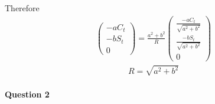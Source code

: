 \documentclass[11pt,a4paper]{article}
\begin{document}
\begin{enumerate}
Therefore
\begin{align}
\begin{pmatrix}
-a C_t \\
-b S_t \\
0
\end{pmatrix}
=
\frac{a^2+b^2}{R}
\begin{pmatrix}
\frac{-a C_t}{\sqrt{a^2+b^2}} \\
\frac{-b S_t}{\sqrt{a^2+b^2}} \\
0
\end{pmatrix}
\end{align}
\begin{align}
R=\sqrt{a^2+b^2}
\end{align}

\end{enumerate}

\newpage

\paragraph{Question 2}
\end{document}
